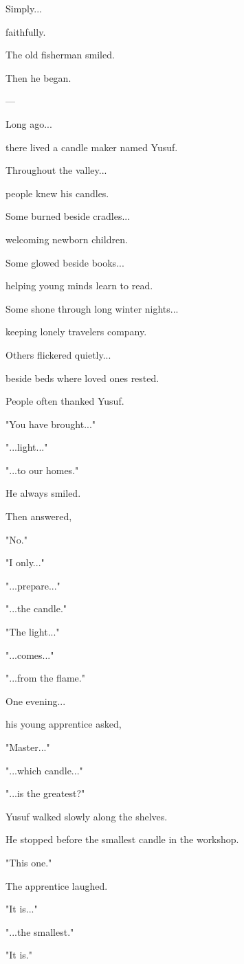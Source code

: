 \documentclass[12pt,openany]{book}
\begin{document}
Simply...

faithfully.

The old fisherman smiled.

Then he began.

---

Long ago...

there lived a candle maker named Yusuf.

Throughout the valley...

people knew his candles.

Some burned beside cradles...

welcoming newborn children.

Some glowed beside books...

helping young minds learn to read.

Some shone through long winter nights...

keeping lonely travelers company.

Others flickered quietly...

beside beds where loved ones rested.

People often thanked Yusuf.

"You have brought..."

"...light..."

"...to our homes."

He always smiled.

Then answered,

"No."

"I only..."

"...prepare..."

"...the candle."

"The light..."

"...comes..."

"...from the flame."

One evening...

his young apprentice asked,

"Master..."

"...which candle..."

"...is the greatest?"

Yusuf walked slowly along the shelves.

He stopped before the smallest candle in the workshop.

"This one."

The apprentice laughed.

"It is..."

"...the smallest."

"It is."
\end{document}
